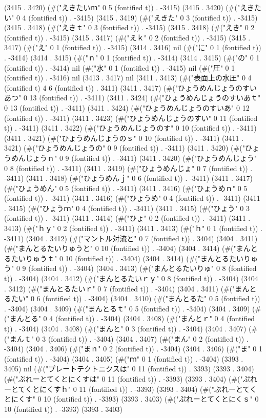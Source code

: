 (3415 . 3420) (#("えきたいｍ" 0 5 (fontified t)) . -3415) (3415 . 3420) (#("えきたい" 0 4 (fontified t)) . -3415) (3415 . 3419) (#("えきた" 0 3 (fontified t)) . -3415) (3415 . 3418) (#("えきｔ" 0 3 (fontified t)) . -3415) (3415 . 3418) (#("えき" 0 2 (fontified t)) . -3415) (3415 . 3417) (#("えｋ" 0 2 (fontified t)) . -3415) (3415 . 3417) (#("え" 0 1 (fontified t)) . -3415) (3414 . 3416) nil (#("に" 0 1 (fontified t)) . -3414) (3414 . 3415) (#("ｎ" 0 1 (fontified t)) . -3414) (3414 . 3415) (#("の" 0 1 (fontified t)) . -3414) nil (#("水" 0 1 (fontified t)) . -3415) nil (#("圧" 0 1 (fontified t)) . -3416) nil (3413 . 3417) nil (3411 . 3413) (#("表面上の水圧" 0 4 (fontified t) 4 6 (fontified t)) . 3411) (3411 . 3417) (#("ひょうめんじょうのすいあつ" 0 13 (fontified t)) . -3411) (3411 . 3424) (#("ひょうめんじょうのすいあｔ" 0 13 (fontified t)) . -3411) (3411 . 3424) (#("ひょうめんじょうのすいあ" 0 12 (fontified t)) . -3411) (3411 . 3423) (#("ひょうめんじょうのすい" 0 11 (fontified t)) . -3411) (3411 . 3422) (#("ひょうめんじょうのす" 0 10 (fontified t)) . -3411) (3411 . 3421) (#("ひょうめんじょうのｓ" 0 10 (fontified t)) . -3411) (3411 . 3421) (#("ひょうめんじょうの" 0 9 (fontified t)) . -3411) (3411 . 3420) (#("ひょうめんじょうｎ" 0 9 (fontified t)) . -3411) (3411 . 3420) (#("ひょうめんじょう" 0 8 (fontified t)) . -3411) (3411 . 3419) (#("ひょうめんじょ" 0 7 (fontified t)) . -3411) (3411 . 3418) (#("ひょうめんｊ" 0 6 (fontified t)) . -3411) (3411 . 3417) (#("ひょうめん" 0 5 (fontified t)) . -3411) (3411 . 3416) (#("ひょうめｎ" 0 5 (fontified t)) . -3411) (3411 . 3416) (#("ひょうめ" 0 4 (fontified t)) . -3411) (3411 . 3415) (#("ひょうｍ" 0 4 (fontified t)) . -3411) (3411 . 3415) (#("ひょう" 0 3 (fontified t)) . -3411) (3411 . 3414) (#("ひょ" 0 2 (fontified t)) . -3411) (3411 . 3413) (#("ｈｙ" 0 2 (fontified t)) . -3411) (3411 . 3413) (#("ｈ" 0 1 (fontified t)) . -3411) (3404 . 3412) (#("マントル対流と" 0 7 (fontified t)) . 3404) (3404 . 3411) (#("まんとるたいりゅうと" 0 10 (fontified t)) . -3404) (3404 . 3414) (#("まんとるたいりゅうｔ" 0 10 (fontified t)) . -3404) (3404 . 3414) (#("まんとるたいりゅう" 0 9 (fontified t)) . -3404) (3404 . 3413) (#("まんとるたいりゅ" 0 8 (fontified t)) . -3404) (3404 . 3412) (#("まんとるたいｒｙ" 0 8 (fontified t)) . -3404) (3404 . 3412) (#("まんとるたいｒ" 0 7 (fontified t)) . -3404) (3404 . 3411) (#("まんとるたい" 0 6 (fontified t)) . -3404) (3404 . 3410) (#("まんとるた" 0 5 (fontified t)) . -3404) (3404 . 3409) (#("まんとるｔ" 0 5 (fontified t)) . -3404) (3404 . 3409) (#("まんとる" 0 4 (fontified t)) . -3404) (3404 . 3408) (#("まんとｒ" 0 4 (fontified t)) . -3404) (3404 . 3408) (#("まんと" 0 3 (fontified t)) . -3404) (3404 . 3407) (#("まんｔ" 0 3 (fontified t)) . -3404) (3404 . 3407) (#("まん" 0 2 (fontified t)) . -3404) (3404 . 3406) (#("まｎ" 0 2 (fontified t)) . -3404) (3404 . 3406) (#("ま" 0 1 (fontified t)) . -3404) (3404 . 3405) (#("ｍ" 0 1 (fontified t)) . -3404) (3393 . 3405) nil (#("プレートテクトニクスは" 0 11 (fontified t)) . 3393) (3393 . 3404) (#("ぷれーとてくとにくすは" 0 11 (fontified t)) . -3393) (3393 . 3404) (#("ぷれーとてくとにくすｈ" 0 11 (fontified t)) . -3393) (3393 . 3404) (#("ぷれーとてくとにくす" 0 10 (fontified t)) . -3393) (3393 . 3403) (#("ぷれーとてくとにくｓ" 0 10 (fontified t)) . -3393) (3393 . 3403) 